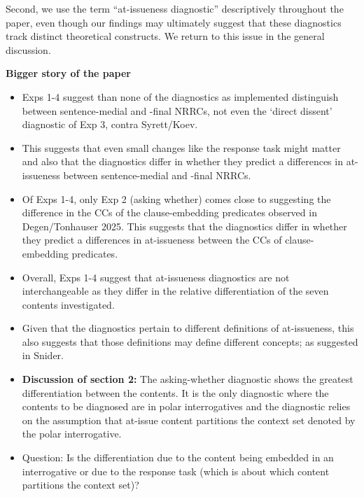 \documentclass[times,linguex,xcolor]{glossa}
\begin{document}
  Second, we use the term “at-issueness diagnostic” descriptively throughout the paper, even though our findings may ultimately suggest that these diagnostics track distinct theoretical constructs. We return to this issue in the general discussion.


\bigskip

\noindent
{\bf Bigger story of the paper}

  \begin{itemize}[leftmargin=12pt]

  \item Exps 1-4 suggest than none of the diagnostics as implemented distinguish between sentence-medial and -final NRRCs, not even the `direct dissent' diagnostic of Exp 3, contra Syrett/Koev. 

  \item This suggests that even small changes like the response task might matter and also that the diagnostics differ in whether they predict a differences in at-issueness between sentence-medial and -final NRRCs.

  \item Of Exps 1-4, only Exp 2 (asking whether) comes close to suggesting the difference in the CCs of the clause-embedding predicates observed in Degen/Tonhauser 2025. This suggests that the diagnostics differ in whether they predict a differences in at-issueness between the CCs of clause-embedding predicates.

  \item Overall, Exps 1-4 suggest that at-issueness diagnostics are not interchangeable as they differ in the relative differentiation of the seven contents investigated. 

  \item Given that the diagnostics pertain to different definitions of at-issueness, this also suggests that those definitions may define different concepts; as suggested in Snider.

  \item {\bf Discussion of section 2:} The asking-whether diagnostic shows the greatest differentiation between the contents.  It is the only diagnostic where the contents to be diagnosed are in polar interrogatives and the diagnostic relies on the assumption that at-issue content partitions the context set denoted by the polar interrogative.

  \item Question: Is the differentiation due to the content being embedded in an interrogative or due to the response task (which is about which content partitions the context set)?


\end{itemize}
\end{document}
